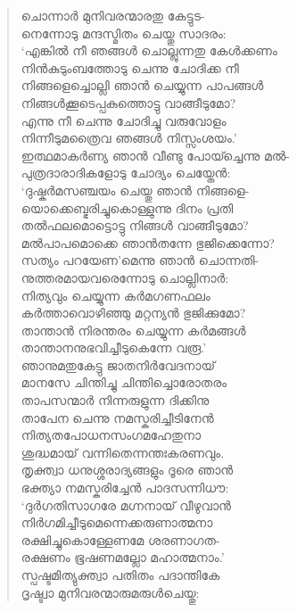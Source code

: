 \begin{verse}
ചൊന്നാര്‍ മുനിവരന്മാരതു കേട്ടുട-\\
നെന്നോടു മന്ദസ്മിതം ചെയ്തു സാദരം:\\
‘എങ്കില്‍ നീ ഞങ്ങള്‍ ചൊല്ലുന്നതു കേള്‍ക്കണം\\
നിന്‍കുടുംബത്തോടു ചെന്നു ചോദിക്ക നീ\\
നിങ്ങളെച്ചൊല്ലി ഞാന്‍ ചെയ്യുന്ന പാപങ്ങള്‍\\
നിങ്ങള്‍ക്കൂടെപ്പകുത്തൊട്ടു വാങ്ങീടുമോ?\\
എന്നു നീ ചെന്നു ചോദിച്ചു വരുവോളം\\
നിന്നീടുമത്രൈവ ഞങ്ങള്‍ നിസ്സംശയം.’\\
ഇത്ഥമാക‍ര്‍ണ്യ ഞാന്‍ വീണ്ടു പോയ്ച്ചെന്നു മല്‍-\\
പുത്രദാരാദികളോടു ചോദ്യം ചെയ്തേന്‍:\\
‘ദുഷ്കര്‍മസഞ്ചയം ചെയ്തു ഞാന്‍ നിങ്ങളെ-\\
യൊക്കെബ്ഭരിച്ചുകൊള്ളുന്നു ദിനം പ്രതി\\
തല്‍ഫലമൊട്ടൊട്ടു നിങ്ങള്‍ വാങ്ങീടുമോ?\\
മല്‍പാപമൊക്കെ ഞാന്‍തന്നേ ഭുജിക്കെന്നോ?\\
സത്യം പറയേണ’മെന്നു ഞാന്‍ ചൊന്നതി-\\
നുത്തരമായവരെന്നോടു ചൊല്ലിനാര്‍:\\
നിത്യവും ചെയ്യുന്ന കര്‍മഗണഫലം\\
കര്‍ത്താവൊഴിഞ്ഞു മറ്റന്യന്‍ ഭുജിക്കുമോ?\\
താന്താന്‍ നിരന്തരം ചെയ്യുന്ന കര്‍മങ്ങള്‍\\
താന്താനനുഭവിച്ചീടുകെന്നേ വരൂ.’\\
ഞാനുമതുകേട്ടു ജാതനിര്‍വേദനായ്\\
മാനസേ ചിന്തിച്ചു ചിന്തിച്ചൊരോതരം\\
താപസന്മാര്‍ നിന്നരുളുന്ന ദിക്കിനു\\
താപേന ചെന്നു നമസ്കരിച്ചീടിനേന്‍\\
നിത്യതപോധനസംഗമഹേതുനാ\\
ശുദ്ധമായ് വന്നിതെന്നന്തഃകരണവും.\\
തൃക്ത്വാ ധനുശ്ശരാദ്യങ്ങളും ദൂരെ ഞാന്‍\\
ഭക്ത്യാ നമസ്കരിച്ചേന്‍ പാദസന്നിധൗ:\\
‘ദുര്‍ഗതിസാഗരേ മഗ്നനായ് വീഴുവാന്‍\\
നിര്‍ഗമിച്ചീടുമെന്നെക്കരുണാത്മനാ\\
രക്ഷിച്ചുകൊള്ളേണമേ ശരണാഗത-\\
രക്ഷണം ഭൂഷണമല്ലോ മഹാത്മനാം.’\\
സ്പഷ്ടമിത്യുക്ത്വാ പതിതം പദാന്തികേ\\
ദൃഷ്ട്വാ മുനിവരന്മാരുമരുള്‍ചെയ്തു:\\

\end{verse}
